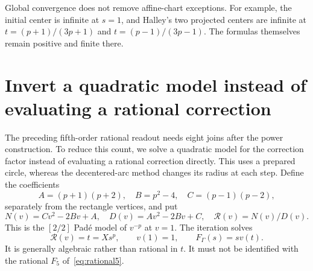 \documentclass[11pt,a4paper]{article}
\theoremstyle{remark}\newtheorem{remark}[theorem]{Remark}
\begin{document}
Global convergence does not remove affine-chart exceptions. For example, the initial center is infinite at $s=1$, and Halley's two projected centers are infinite at $t=(p+1)/(3p+1)$ and $t=(p-1)/(3p-1)$. The formulas themselves remain positive and finite there.

\section{Invert a quadratic model instead of evaluating a rational correction}\label{sec:inverse}
The preceding fifth-order rational readout needs eight joins after the power construction. To reduce this count, we solve a quadratic model for the correction factor instead of evaluating a rational correction directly. This uses a prepared circle, whereas the decentered-arc method changes its radius at each step. Define the coefficients
\begin{equation}\label{eq:ABC}
 A=(p+1)(p+2),\quad B=p^2-4,\quad C=(p-1)(p-2),
\end{equation}
separately from the rectangle vertices, and put
\begin{equation}\label{eq:model}
 N(v)=Cv^2-2Bv+A,\quad D(v)=Av^2-2Bv+C,\quad \mathcal R(v)=N(v)/D(v).
\end{equation}
This is the $[2/2]$ Pad\'e model of $v^{-p}$ at $v=1$. The iteration solves
\begin{equation}\label{eq:implicit}
 \mathcal R(v)=t=Xs^p,\qquad v(1)=1,\qquad F_\Gamma(s)=sv(t).
\end{equation}
It is generally algebraic rather than rational in $t$. It must not be identified with the rational $F_5$ of~\eqref{eq:rational5}.
\end{document}
